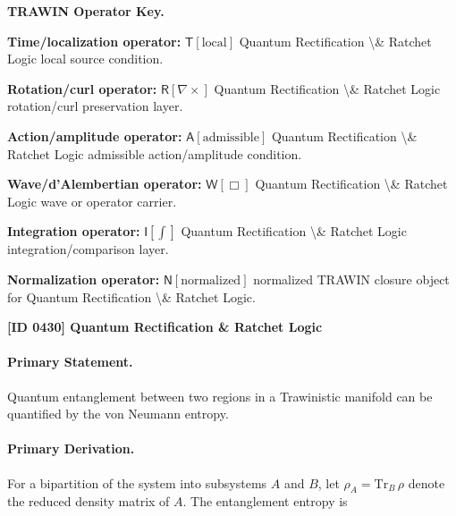 \par\vspace{0.45\baselineskip}
\noindent\begin{minipage}[t]{\linewidth}
\begingroup
\small
\raggedright
\textbf{TRAWIN Operator Key.}\par
\noindent\textbf{Time/localization operator:} $\mathsf{T}\!\left[\mathrm{local}\right]$ Quantum Rectification \textbackslash{}\& Ratchet Logic local source condition.\par
\noindent\textbf{Rotation/curl operator:} $\mathsf{R}\!\left[\nabla\times\right]$ Quantum Rectification \textbackslash{}\& Ratchet Logic rotation/curl preservation layer.\par
\noindent\textbf{Action/amplitude operator:} $\mathsf{A}\!\left[\mathrm{admissible}\right]$ Quantum Rectification \textbackslash{}\& Ratchet Logic admissible action/amplitude condition.\par
\noindent\textbf{Wave/d'Alembertian operator:} $\mathsf{W}\!\left[\Box\right]$ Quantum Rectification \textbackslash{}\& Ratchet Logic wave or operator carrier.\par
\noindent\textbf{Integration operator:} $\mathsf{I}\!\left[\int\right]$ Quantum Rectification \textbackslash{}\& Ratchet Logic integration/comparison layer.\par
\noindent\textbf{Normalization operator:} $\mathsf{N}\!\left[\mathrm{normalized}\right]$ normalized TRAWIN closure object for Quantum Rectification \textbackslash{}\& Ratchet Logic.\par
\endgroup
\end{minipage}

\clearpage
\noindent\textbf{[ID 0430] Quantum Rectification \& Ratchet Logic}\par
\vspace{0.35em}
\paragraph{Primary Statement.}

Quantum entanglement between two regions in a Trawinistic manifold can be quantified by the von Neumann entropy.

\paragraph{Primary Derivation.}

For a bipartition of the system into subsystems $A$ and $B$, let $\rho_A = \mathrm{Tr}_B\,\rho$ denote the reduced density matrix of $A$.  The entanglement entropy is

